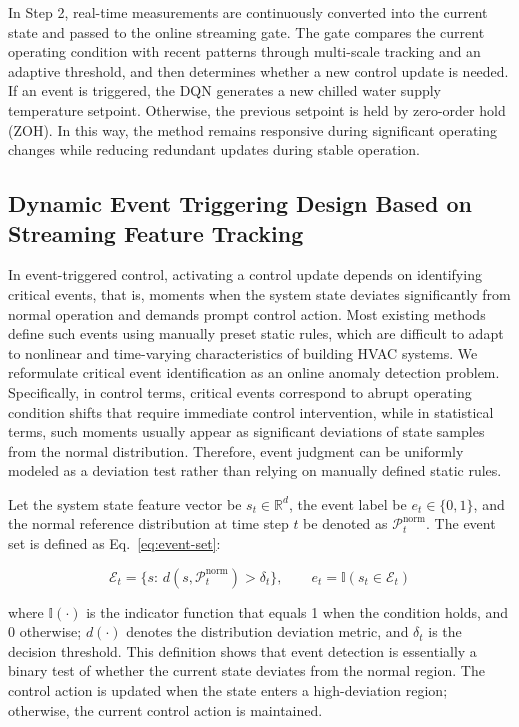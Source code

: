 \documentclass[preprint,12pt]{elsarticle}
\begin{document}
In Step 2, real-time measurements are continuously converted into the current state and passed to the online streaming gate. The gate compares the current operating condition with recent patterns through multi-scale tracking and an adaptive threshold, and then determines whether a new control update is needed. If an event is triggered, the DQN generates a new chilled water supply temperature setpoint. Otherwise, the previous setpoint is held by zero-order hold (ZOH). In this way, the method remains responsive during significant operating changes while reducing redundant updates during stable operation.

\subsection{Dynamic Event Triggering Design Based on Streaming Feature Tracking}\label{dynamic-event-triggering-design-based-on-streaming-feature-tracking}

In event-triggered control, activating a control update depends on identifying critical events, that is, moments when the system state deviates significantly from normal operation and demands prompt control action. Most existing methods define such events using manually preset static rules, which are difficult to adapt to nonlinear and time-varying characteristics of building HVAC systems. We reformulate critical event identification as an online anomaly detection problem. Specifically, in control terms, critical events correspond to abrupt operating condition shifts that require immediate control intervention, while in statistical terms, such moments usually appear as significant deviations of state samples from the normal distribution. Therefore, event judgment can be uniformly modeled as a deviation test rather than relying on manually defined static rules.

Let the system state feature vector be \(s_t\in\mathbb{R}^d\), the event label be \(e_t\in\{0,1\}\), and the normal reference distribution at time step \(t\) be denoted as \(\mathcal{P}^{\text{norm}}_t\). The event set is defined as Eq.~\eqref{eq:event-set}:

\[
\mathcal{E}_t=\{s:\,d(s,\mathcal{P}^{\text{norm}}_t)>\delta_t\},\qquad
e_t=\mathbb{I}(s_t\in\mathcal{E}_t) \tag{1}\label{eq:event-set}
\]

\noindent where \(\mathbb{I}(\cdot)\) is the indicator function that equals 1 when the condition holds, and 0 otherwise; \(d(\cdot)\) denotes the distribution deviation metric, and \(\delta_t\) is the decision threshold. This definition shows that event detection is essentially a binary test of whether the current state deviates from the normal region. The control action is updated when the state enters a high-deviation region; otherwise, the current control action is maintained.
\end{document}
